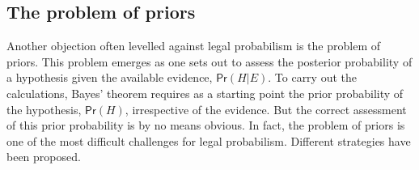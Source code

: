 \documentclass{article}
\newcommand{\pr}{\mathsf{Pr}}
\begin{document}




























\subsection{The problem of priors}
\label{subsec:prior}


Another  objection often levelled against legal probabilism is 
the problem of priors.
This problem emerges as one sets out to assess the posterior probability of a hypothesis given the available evidence, $\pr(H \vert E)$. To carry out the calculations, Bayes' theorem requires  as a starting point the prior probability of the hypothesis, $\pr(H)$, irrespective of the evidence. 
But the correct assessment of this prior probability is by no means obvious. 
In fact, the problem of priors is one of the most difficult challenges for legal probabilism.
Different strategies have been proposed. 
\end{document}
